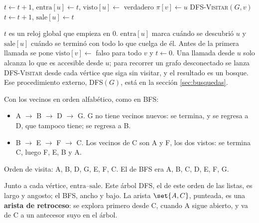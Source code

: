 \documentclass[11pt,letterpaper]{article}
\begin{document}
\begin{algorithm}[H]
\caption{\textsc{DFS-Visitar}$(G, u)$}
\begin{algorithmic}[1]
\State $t \gets t + 1$, \quad $\text{entra}[u] \gets t$, \quad
       $\text{visto}[u] \gets$ verdadero
    \State $\pi[v] \gets u$
    \State \textsc{DFS-Visitar}$(G, v)$
  \EndIf
\EndFor
\State $t \gets t + 1$, \quad $\text{sale}[u] \gets t$
\end{algorithmic}
\end{algorithm}

$t$ es un reloj global que empieza en $0$. $\text{entra}[u]$ marca
cuándo se descubrió $u$ y $\text{sale}[u]$ cuándo se terminó con todo
lo que cuelga de él. Antes de la primera llamada se pone
$\text{visto}[v] \gets$ falso para todo $v$ y $t \gets 0$. Una llamada
desde $u$ solo alcanza lo que es accesible desde $u$; para recorrer un
grafo desconectado se lanza \textsc{DFS-Visitar} desde cada vértice
que siga sin visitar, y el resultado es un bosque. Ese procedimiento
externo, \textsc{DFS}$(G)$, está en la sección \ref{sec:busquedas}.

\begin{ejemplo}
  Con los vecinos en orden alfabético, como en BFS:
  \begin{itemize}[itemsep=0.1em]
    \item A $\to$ B $\to$ D $\to$ G. G no tiene vecinos nuevos: se
          termina, y se regresa a D, que tampoco tiene; se regresa a B.
    \item B $\to$ E $\to$ F $\to$ C. Los vecinos de C son A y F, los dos
          vistos: se termina C, luego F, E, B y A.
  \end{itemize}
  Orden de visita: A, B, D, G, E, F, C. El de BFS era A, B, C, D, E, F,
  G.
  \begin{center}
  \end{center}
  Junto a cada vértice, $\text{entra}$--$\text{sale}$. Este árbol DFS,
  el de este orden de las listas, es largo y angosto; el BFS, ancho y
  bajo. La arista
  $\set{A, C}$, punteada, es una \textbf{arista de retroceso}: se
  explora primero desde C, cuando A sigue abierto, y va de C a un
  antecesor suyo en el árbol.
\end{ejemplo}
\end{document}
